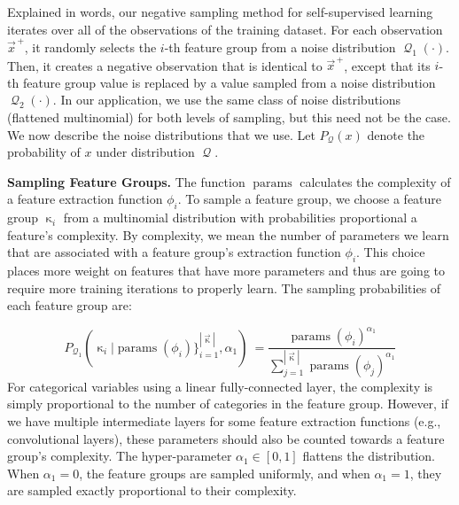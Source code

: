 \documentclass{article}
\newcommand{\vect}[1]{\vec{#1}}
\DeclareMathOperator{\q}{{\mathcal{Q}}}
\begin{document}
Explained in words, our negative sampling method for self-supervised learning iterates over all of the observations of the training dataset.
For each observation $\vect{x}^{\,+}$, it randomly selects the $i$-th feature group from a noise distribution $\q_1(\cdot)$.
Then,  it creates a negative observation that is identical to $\vect{x}^{\,+}$, except that its $i$-th feature group value is replaced by a value sampled from a noise distribution $\q_2(\cdot)$.
In our application, we use the same class of noise distributions (flattened multinomial) for both levels of sampling, but this need not be the case.
We now describe the noise distributions that we use.
Let  $P_{\q}(x)$ denote the probability of $x$ under distribution $\q$.

\textbf{Sampling Feature Groups.} The function $\operatorname{params}$ calculates the complexity of a  feature extraction function $\phi_i$.
To sample a feature group, we choose a feature group $\upkappa_i$ from a multinomial distribution with probabilities proportional a feature's complexity.
By complexity, we mean the number of parameters we learn that are associated with a feature group's extraction function $\phi_i$.
This choice places more weight on features that have more parameters and thus are going to require more training iterations to properly learn. The sampling probabilities of each feature group are:

\begin{equation}
P_{\q_1}(\upkappa_i|\operatorname{params}(\phi_i)\}_{i=1}^{|\vect{\upkappa}|},\alpha_1 )  \
= \frac{\operatorname{params}(\phi_i)^{\alpha_1}}{\sum_{j=1}^{|\vect{\upkappa}|} \operatorname{params}(\phi_j)^{\alpha_1}}
\end{equation}
For categorical variables using a linear fully-connected layer, the complexity is simply proportional to the number of categories in the feature group.
However, if we have multiple intermediate layers for some feature extraction functions (e.g., convolutional layers), these parameters should also be counted towards a feature group's complexity.
The hyper-parameter $\alpha_1 \in [0,1]$ flattens the distribution.
 When  $\alpha_1=0$, the feature groups are sampled uniformly,
 and when $\alpha_1=1$, they are sampled exactly proportional to their complexity.
\end{document}
